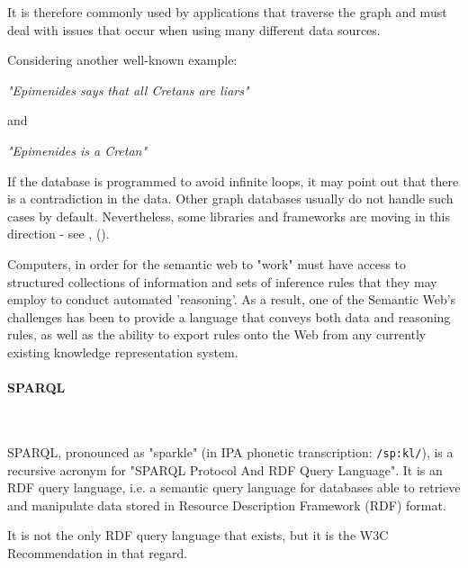It is therefore commonly used by applications that traverse the graph and must deal with issues that occur when using many different data sources.

Considering another well-known example:
\begin{quoting}[begintext={}, endtext={}]
	\centering\textit{"Epimenides says that all Cretans are liars"}
\end{quoting}
and
\begin{quoting}[begintext={}, endtext={}]
	\centering\textit{"Epimenides is a Cretan"}
\end{quoting}
If the database is programmed to avoid infinite loops, it may point out that there is a contradiction in the data.
Other graph databases usually do not handle such cases by default.
Nevertheless, some libraries and frameworks are moving in this direction - see , \citeauthor{ApacheTinkerPopWebsite2021} (\citeyear{ApacheTinkerPopWebsite2021}).

Computers, in order for the semantic web to "work" must have access to structured collections of information and sets of inference rules that they may employ to conduct automated 'reasoning'.
As a result, one of the Semantic Web's challenges has been to provide a language that conveys both data and reasoning rules, as well as the ability to export rules onto the Web from any currently existing knowledge representation system.
\par
\paragraph{SPARQL}\mbox{}\\\indent
\begin{definition}[of SPARQL]\label{definition:ofSPARQL}
	SPARQL, pronounced as "sparkle" (in IPA phonetic transcription:
	\textnormal{\texttt{/\textprimstress sp\textscripta:kl/}}), is a recursive acronym for "SPARQL Protocol And RDF Query Language".
	It is an RDF query language, i.e. a semantic query language for databases able to retrieve and manipulate data stored in Resource Description Framework (RDF) format.
\end{definition}

It is not the only RDF query language that exists, but it is the W3C Recommendation in that regard.

